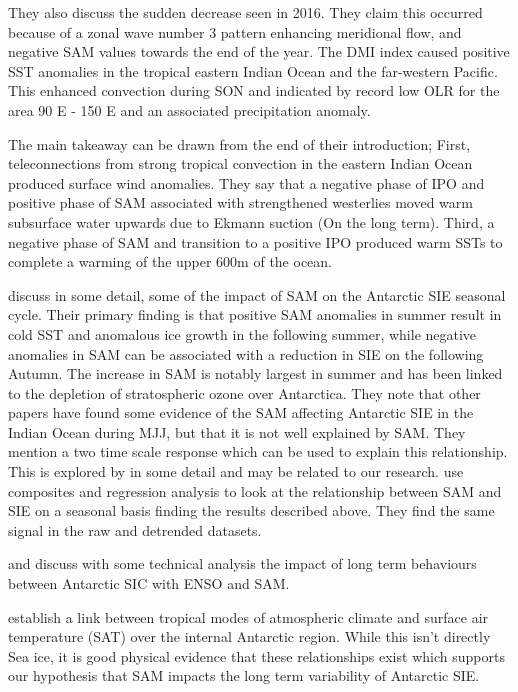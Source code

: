\documentclass[../main.tex]{subfiles}
\begin{document}
They also discuss the sudden decrease seen in 2016. They claim this occurred because of a zonal wave number 3 pattern enhancing meridional flow, and negative SAM values towards the end of the year. The DMI index caused positive SST anomalies in the tropical eastern Indian Ocean and the far-western Pacific. This enhanced convection during SON and indicated by record low OLR for the area 90 E - 150 E and an associated precipitation anomaly.

The main takeaway can be drawn from the end of their introduction; First, teleconnections from strong tropical convection in the eastern Indian Ocean produced surface wind anomalies.
They say that a negative phase of IPO and positive phase of SAM associated with strengthened westerlies moved warm subsurface water upwards due to Ekmann suction (On the long term). Third, a negative phase of SAM and transition to a positive IPO produced warm SSTs to complete a warming of the upper 600m of the ocean.
\medskip

\cite{Doddridge2017} discuss in some detail, some of the impact of SAM on the Antarctic SIE seasonal cycle. Their primary finding is that positive SAM anomalies in summer result in cold SST and anomalous ice growth in the following summer, while negative anomalies in SAM can be associated with a reduction in SIE on the following Autumn. The increase in SAM is notably largest in summer and has been linked to the depletion of stratospheric ozone over Antarctica. They note that other papers have found some evidence of the SAM affecting Antarctic SIE in the Indian Ocean during MJJ, but that it is not well explained by SAM. They mention a two time scale response which can be used to explain this relationship. This is explored by \cite{Ferreira} in some detail and may be related to our research. \cite{Doddridge2017} use composites and regression analysis to look at the relationship between SAM and SIE on a seasonal basis finding the results described above. They find the same signal in the raw and detrended datasets.


\cite{Simpkins2012} and \cite{Kohyama2016} discuss with some technical analysis the impact of long term behaviours between Antarctic SIC with ENSO and SAM.



\cite{Clem2020} establish a link between tropical modes of atmospheric climate and surface air temperature (SAT) over the internal Antarctic region. While this isn't directly Sea ice, it is good physical evidence that these relationships exist which supports our hypothesis that SAM impacts the long term variability of Antarctic SIE.
\end{document}
